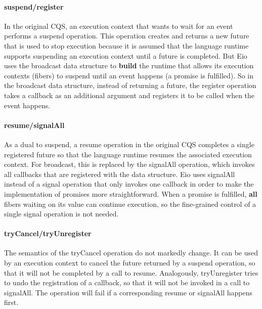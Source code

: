 \paragraph*{suspend/register}
In the original CQS, an execution context that wants to wait for an event performs a suspend operation.
This operation creates and returns a new future that is used to stop execution because it is assumed that the language runtime supports suspending an execution context until a future is completed.
But Eio uses the broadcast data structure to \textbf{build} the runtime that allows its execution contexts (fibers) to suspend until an event happens (a promise is fulfilled).
So in the broadcast data structure, instead of returning a future, the register operation takes a callback as an additional argument and registers it to be called when the event happens.

\paragraph*{resume/signalAll}
As a dual to suspend, a resume operation in the original CQS completes a single registered future so that the language runtime resumes the associated execution context.
For broadcast, this is replaced by the signalAll operation, which invokes all callbacks that are registered with the data structure.
Eio uses signalAll instead of a signal operation that only invokes one callback in order to make the implementation of promises more straightforward.
When a promise is fulfilled, \textbf{all} fibers waiting on its value can continue execution, so the fine-grained control of a single signal operation is not needed.

\paragraph*{tryCancel/tryUnregister}
The semantics of the tryCancel operation do not markedly change.
It can be used by an execution context to cancel the future returned by a suspend operation, so that it will not be completed by a call to resume.
Analogously, tryUnregister tries to undo the registration of a callback, so that it will not be invoked in a call to signalAll.
The operation will fail if a corresponding resume or signalAll happens first.


